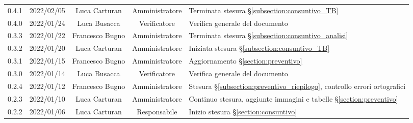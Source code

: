 \begin{center}
\begin{longtable}[c]{c | c | c | c | p{5cm}}
		0.4.1                                                      & 2022/02/05 & Luca Carturan                          & Amministratore & Terminata stesura §\ref{subsection:consuntivo_TB}                                                                                         \\
		0.4.0                                                      & 2022/01/24 & Luca Busacca                           & Verificatore   & Verifica generale del documento                                                                                                           \\
		0.3.3                                                      & 2022/01/22 & Francesco Bugno                        & Amministratore & Terminata stesura §\ref{subsection:consuntivo_analisi}                                                                                    \\
		0.3.2                                                      & 2022/01/20 & Luca Carturan                          & Amministratore & Iniziata stesura §\ref{subsection:consuntivo_TB}                                                                                          \\
		0.3.1                                                      & 2022/01/15 & Francesco Bugno                        & Amministratore & Aggiornamento §\ref{section:preventivo}                                                                                                   \\
		0.3.0                                                      & 2022/01/14 & Luca Busacca                           & Verificatore   & Verifica generale del documento                                                                                                           \\
		0.2.4                                                      & 2022/01/12 & Francesco Bugno                        & Amministratore & Stesura §\ref{subsection:preventivo_riepilogo}, controllo errori ortografici                                                              \\
		0.2.3                                                      & 2022/01/10 & Luca Carturan                          & Amministratore & Continuo stesura, aggiunte immagini e tabelle §\ref{section:preventivo}                                                                   \\
		0.2.2                                                      & 2022/01/06 & Luca Carturan                          & Responsabile   & Inizio stesura §\ref{section:consuntivo}                                                                                                  \\

\end{longtable}
\end{center}
